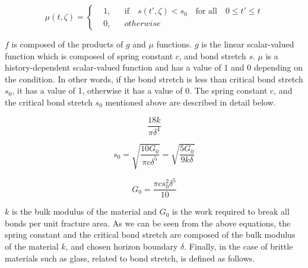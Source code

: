 \begin{equation}
  \mu(t,\zeta) = \left \{
  \begin{aligned}
    &1, && \textrm{if} \quad s(t',\zeta)<s_0 \quad \textrm{for all} \quad 0 \leq t' \leq t\\
    &0, && otherwise
  \end{aligned} \right.
\end{equation}


$f$ is composed of the products of $g$ and $\mu$ functions. $g$ is the linear scalar-valued function which is composed of spring constant $c$, and bond stretch $s$. $\mu$ is a history-dependent scalar-valued function and has a value of 1 and 0 depending on the condition. In other words, if the bond stretch is less than critical bond stretch $s_0$, it has a value of 1, otherwise it has a value of 0. The spring constant c, and the critical bond stretch $s_0$ mentioned above are described in detail below.

 \begin{equation}
\frac{18k}{\pi\delta^4}
\end{equation}

 \begin{equation}
s_0=\sqrt{\frac{10G_0}{\pi c\delta^5}}=\sqrt{\frac{5G_0}{9 k\delta}}
\end{equation}

 \begin{equation}
G_0=\frac{\pi cs_0^2\delta^5}{10} 
\end{equation}

$k$ is the bulk modulus of the material and $G_0$ is the work required to break all bonds per unit fracture area. As we can be seen from the above equations, the spring constant and the critical bond stretch are composed of the bulk modulus of the material $k$, and chosen horizon boundary $\delta$. Finally, in the case of brittle materials such as glass, related to bond stretch, is defined as follows.

